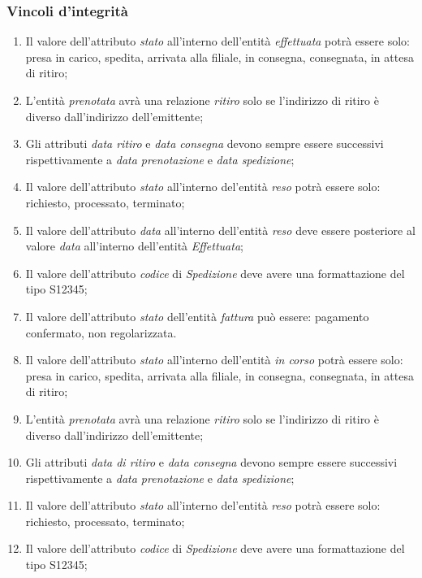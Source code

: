 \documentclass[a4paper,12pt]{article}
\begin{document}
\subsubsection*{Vincoli d'integrità}
\begin{enumerate}
  \item Il valore dell'attributo \textit{stato} all'interno dell'entità \textit{effettuata} potrà essere solo: presa in carico, spedita, arrivata alla filiale, in consegna, consegnata, in attesa di ritiro;
  \item L'entità \textit{prenotata} avrà una relazione \textit{ritiro} solo se l'indirizzo di ritiro è diverso dall'indirizzo dell'emittente;
  \item Gli attributi \textit{data ritiro} e \textit{data consegna} devono sempre essere successivi rispettivamente a \textit{data prenotazione} e \textit{data spedizione};
	\item Il valore dell'attributo \textit{stato} all'interno del'entità \textit{reso} potrà essere solo: richiesto, processato, terminato;
	\item Il valore dell'attributo \textit{data} all'interno dell'entità \textit{reso} deve essere posteriore al valore \textit{data} all'interno dell'entità \textit{Effettuata};
	\item Il valore dell'attributo \textit{codice} di \textit{Spedizione} deve avere una formattazione del tipo S12345;
	\item Il valore dell'attributo \textit{stato} dell'entità \textit{fattura} può essere: pagamento confermato, non regolarizzata. 
	\item Il valore dell'attributo \textit{stato} all'interno dell'entità \textit{in corso} potrà essere solo: presa in carico, spedita, arrivata alla filiale, in consegna, consegnata, in attesa di ritiro;
	\item L'entità \textit{prenotata} avrà una relazione \textit{ritiro} solo se l'indirizzo di ritiro è diverso dall'indirizzo dell'emittente;
	\item Gli attributi \textit{data di ritiro} e \textit{data consegna} devono sempre essere successivi rispettivamente a \textit{data prenotazione} e \textit{data spedizione};
	\item Il valore dell'attributo \textit{stato} all'interno del'entità \textit{reso} potrà essere solo: richiesto, processato, terminato;
	\item Il valore dell'attributo \textit{codice} di \textit{Spedizione} deve avere una formattazione del tipo S12345;
	
\end{enumerate}
\end{document}
